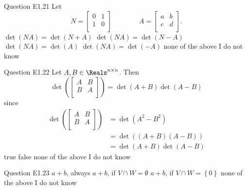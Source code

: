 \begin{frame}{Question E1.21}
	\QuestionBody
	{
		Let
		$$
		N
		=
		\begin{bmatrix}
			0 & 1 \\
			1 & 0 \\
		\end{bmatrix}
		\qquad
		\qquad
		A
		=
		\begin{bmatrix}
			a & b \\
			c & d \\
		\end{bmatrix} .
		$$
	}
	\QuestionAnswers
	{
		\answer $\det \left( NA \right) = \det \left( N + A \right)$
		\answer $\det \left( NA \right) = \det \left( N - A \right)$
		\answer $\det \left( NA \right) = \det \left( A \right)$
		\correctanswer $\det \left( NA \right) = \det \left( - A \right)$
		\answer none of the above
		\answer I do not know
	}
	\QuestionSolution{}
	\QuestionAuthor{}
	\QuestionVersion{}
\end{frame}


\begin{frame}{Question E1.22}
	\QuestionBody
	{
		Let $A, B \in \Reals^{n \times n}$. Then
		$$
		\det
		\left( 
			\begin{bmatrix}
				A & B \\
				B & A \\
			\end{bmatrix}
		\right)
		=
		\det \left( A + B \right)
		\det \left( A - B \right)
		$$
		since
		$$
		\begin{array}{ll}
			\det
			\left( 
				\begin{bmatrix}
					A & B \\
					B & A \\
				\end{bmatrix}
			\right)
			& =
			\det
			\left( 
				A^{2} - B^{2}
			\right) \\
			& =
			\det
			\left( 
				(A + B)
				(A - B)
			\right) \\
			& =
			\det \left( A + B \right)
			\det \left( A - B \right)
		\end{array}
		$$
	}
	\QuestionAnswers
	{
		\answer true
		\answer false
		\correctanswer none of the above
		\answer I do not know
	}
	\QuestionSolution{}
	\QuestionAuthor{}
	\QuestionVersion{}
\end{frame}


\begin{frame}{Question E1.23}
	\QuestionAnswers
	{
		\answer $a + b$, always
		\answer $a + b$, if $V \cap W = \emptyset$
		\correctanswer $a + b$, if $V \cap W = \left\{ 0 \right\}$
		\answer none of the above
		\answer I do not know
	}
	\QuestionSolution{}
	\QuestionAuthor{}
	\QuestionVersion{}
\end{frame}


